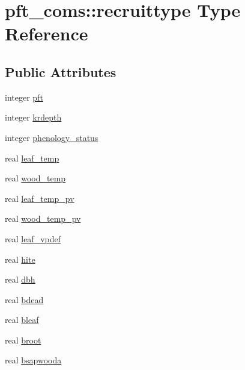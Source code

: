 \hypertarget{structpft__coms_1_1recruittype}{}\section{pft\+\_\+coms\+:\+:recruittype Type Reference}
\label{structpft__coms_1_1recruittype}
\subsection*{Public Attributes}
\begin{DoxyCompactItemize}
\item 
integer \hyperlink{structpft__coms_1_1recruittype_a291b258303c72e665752c00d4d53754d}{pft}
\item 
integer \hyperlink{structpft__coms_1_1recruittype_a494e5375d5daec0c804b2131b7cd8d31}{krdepth}
\item 
integer \hyperlink{structpft__coms_1_1recruittype_a60af6935fa0af178c29704911dc765d0}{phenology\+\_\+status}
\item 
real \hyperlink{structpft__coms_1_1recruittype_a63277ff3097ef4878f23b2e01624d4c4}{leaf\+\_\+temp}
\item 
real \hyperlink{structpft__coms_1_1recruittype_a39f74782c87f308b9f1578e5f64d2e5f}{wood\+\_\+temp}
\item 
real \hyperlink{structpft__coms_1_1recruittype_af1ee1e4b91659fcf9eea0ed9da2a96ae}{leaf\+\_\+temp\+\_\+pv}
\item 
real \hyperlink{structpft__coms_1_1recruittype_a0d5f8dd1bdc575a902052df9d43d26e5}{wood\+\_\+temp\+\_\+pv}
\item 
real \hyperlink{structpft__coms_1_1recruittype_ae6f181280fb0a62c24a62580f6b76d46}{leaf\+\_\+vpdef}
\item 
real \hyperlink{structpft__coms_1_1recruittype_ada76357440c3a76d0f6c490c8ed793f1}{hite}
\item 
real \hyperlink{structpft__coms_1_1recruittype_a7bb2f4d616311b96774ba965e579a625}{dbh}
\item 
real \hyperlink{structpft__coms_1_1recruittype_adbd20b6840a8ccdd160cd2ccea8dcca1}{bdead}
\item 
real \hyperlink{structpft__coms_1_1recruittype_a9ad80c7a2b183b1bd3c799425f5641d0}{bleaf}
\item 
real \hyperlink{structpft__coms_1_1recruittype_a47ef4fb7a134ea59298a87b80da1b29f}{broot}
\item 
real \hyperlink{structpft__coms_1_1recruittype_aa3e1c4c46afc1396b1f9231311c11503}{bsapwooda}

\end{DoxyCompactItemize}

